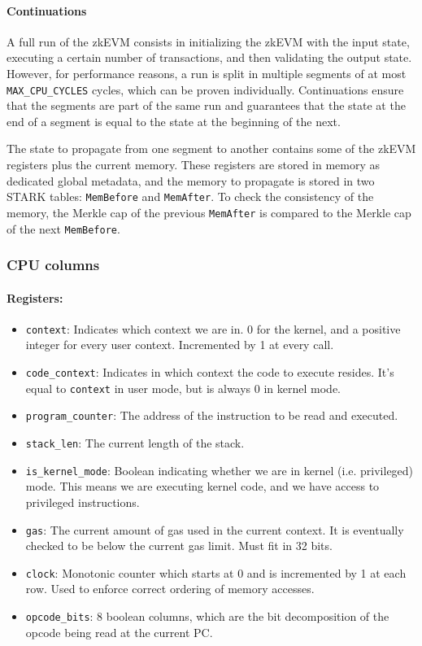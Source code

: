 \paragraph*{Continuations}

A full run of the zkEVM consists in initializing the zkEVM with the input state, executing a certain number of transactions, and then validating the output state.
However, for performance reasons, a run is split in multiple segments of at most \texttt{MAX\_CPU\_CYCLES} cycles, which can be proven individually. Continuations ensure that the segments are part of the
same run and guarantees that the state at the end of a segment is equal to the state at the beginning of the next.

The state to propagate from one segment to another contains some of the zkEVM registers plus the current memory. These registers
are stored in memory as dedicated global metadata, and the memory to propagate is stored in two STARK tables: \texttt{MemBefore} and \texttt{MemAfter}. To check the
consistency of the memory, the Merkle cap of the previous \texttt{MemAfter} is compared to the Merkle cap of the next \texttt{MemBefore}.

\subsubsection{CPU columns}

\paragraph*{Registers:} \begin{itemize}
    \item \texttt{context}: Indicates which context we are in. 0 for the kernel, and a positive integer for every user context. Incremented by 1 at every call.
    \item \texttt{code\_context}: Indicates in which context the code to execute resides. It's equal to \texttt{context} in user mode, but is always 0 in kernel mode.
    \item \texttt{program\_counter}: The address of the instruction to be read and executed.
    \item \texttt{stack\_len}: The current length of the stack.
    \item \texttt{is\_kernel\_mode}: Boolean indicating whether we are in kernel (i.e. privileged) mode. This means we are executing kernel code, and we have access to
privileged instructions.
    \item \texttt{gas}: The current amount of gas used in the current context. It is eventually checked to be below the current gas limit. Must fit in 32 bits.
    \item \texttt{clock}: Monotonic counter which starts at 0 and is incremented by 1 at each row. Used to enforce correct ordering of memory accesses. 
    \item \texttt{opcode\_bits}: 8 boolean columns, which are the bit decomposition of the opcode being read at the current PC.
\end{itemize}

